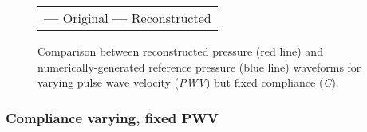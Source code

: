 \begin{figure}[h!]
\begin{center}
\begin{tabular}{m{3.5cm} m{3.5cm} m{3.5cm} m{3.5cm}}
\multicolumn{4}{c}{
\LARGE{\color{blue} \textbf{---}} \normalsize Original
\LARGE{\color{red} \textbf{---}} \normalsize Reconstructed
}
\end{tabular}
\caption[Comparison between reconstructed pressure and numerically-generated reference pressure waveforms for varying pulse wave velocity (\textit{PWV}) but fixed compliance (\textit{C})]{Comparison between reconstructed pressure (red line) and numerically-generated reference pressure (blue line) waveforms for varying pulse wave velocity (\textit{PWV}) but fixed compliance (\textit{C}).}
\end{center}
\end{figure}

\clearpage

\subsubsection{Compliance varying, fixed PWV}

